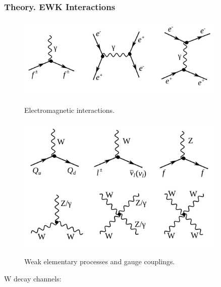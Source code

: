 \begin{frame}\frametitle{Theory. EWK Interactions}

\begin{figure}[htb]
  \begin{center}
    {\includegraphics[width=0.90\textwidth]{../figs/Intro/feynmEM.png}}
    \caption\tiny{Electromagnetic interactions.}
    \label{fig:feynmEM}
  \end{center}
\end{figure}

\begin{figure}[htb]
  \begin{center}
    {\includegraphics[width=0.90\textwidth]{../figs/Intro/feynmW.png}}
    \caption\tiny{Weak elementary processes and gauge couplings.}
    \label{fig:feynmW}
  \end{center}
\end{figure}

  \scriptsize
   W decay channels:

\end{frame}%

